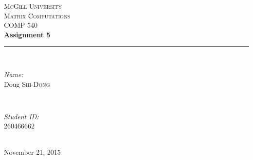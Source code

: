 \begin{titlepage}

\newcommand{\HRule}{\rule{\linewidth}{0.5mm}} %

\center %
 


\textsc{\LARGE McGill University}\\[3.5cm]
\textsc{\Large Matrix Computations}\\[0.5cm] 
\textsc{\large COMP 540}\\[2.5cm]


{ \huge \bfseries Assignment 5}\\[1.5cm] %

\HRule \\[0.4cm]

\begin{minipage}{0.4\textwidth}
\begin{flushleft} \large
\emph{Name:}\\
Doug \textsc{Shi-Dong} %
\end{flushleft}
\end{minipage}
~
\begin{minipage}{0.4\textwidth}
\begin{flushright} \large
\emph{Student ID:} \\
260466662\\
\end{flushright}
\end{minipage}\\[4cm]

\vfill{}
{\large November 21, 2015}\\[2cm]

\end{titlepage}
